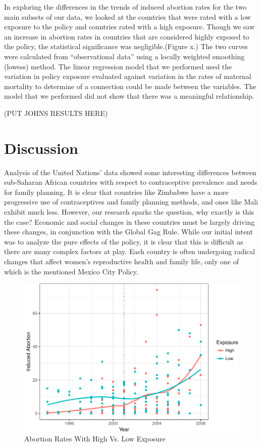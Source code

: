 \documentclass[11pt,]{article}
\makeatletter
\def\maxwidth{\ifdim\Gin@nat@width>\linewidth\linewidth
\else\Gin@nat@width\fi}
\let\Oldincludegraphics\includegraphics
\renewcommand{\includegraphics}[1]{\Oldincludegraphics[width=\maxwidth]{#1}}
\makeatother
\begin{document}
In exploring the differences in the trends of induced abortion rates for
the two main subsets of our data, we looked at the countries that were
rated with a low exposure to the policy and countries rated with a high
exposure. Though we saw an increase in abortion rates in countries that
are considered highly exposed to the policy, the statistical
significance was negligible.(Figure x.) The two curves were calculated
from ``observational data'' using a locally weighted smoothing (lowess)
method. The linear regression model that we performed used the variation
in policy exposure evaluated against variation in the rates of maternal
mortality to determine of a connection could be made between the
variables. The model that we performed did not show that there was a
meaningful relationship.

(PUT JOHNS RESULTS HERE)

\section{Discussion}\label{discussion}

Analysis of the United Nations' data showed some interesting differences
between sub-Saharan African countries with respect to contraceptive
prevalence and needs for family planning. It is clear that countries
like Zimbabwe have a more progressive use of contraceptives and family
planning methods, and ones like Mali exhibit much less. However, our
research sparks the question, why exactly is this the case? Economic and
social changes in these countries must be largely driving these changes,
in conjunction with the Global Gag Rule. While our initial intent was to
analyze the pure effects of the policy, it is clear that this is
difficult as there are many complex factors at play. Each country is
often undergoing radical changes that affect women's reproductive health
and family life, only one of which is the mentioned Mexico City Policy.

\begin{figure}
\centering
\includegraphics{final-paper_files/figure-latex/unnamed-chunk-1-1.pdf}
\caption{Abortion Rates With High Vs. Low Exposure}
\end{figure}
\end{document}
